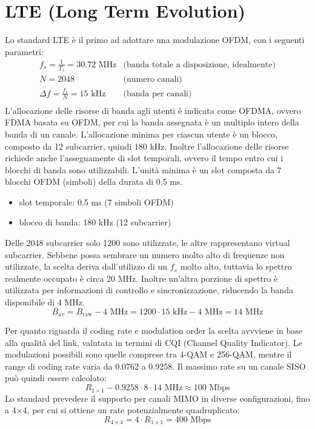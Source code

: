 \section*{LTE (Long Term Evolution)}
Lo standard LTE è il primo ad adottare una modulazione OFDM, con i seguenti parametri:
\[
    \begin{array}{ll}
        f_s = \frac{1}{T_s} = 30.72 \text{ MHz} & \text{(banda totale a disposizione, idealmente)} \\
        N = 2048 & \text{(numero canali)} \\
        \Delta f = \frac{f_s}{N} = 15 \text{ kHz} & \text{(banda per canali)} \\
    \end{array}    
\]
L'allocazione delle risorse di banda agli utenti è indicata come OFDMA, ovvero FDMA basata su OFDM, per cui la banda assegnata è un multiplo intero della banda di un canale. L'allocazione minima per ciascun utente è un blocco, composto da 12 subcarrier, quindi 180 kHz.
Inoltre l'allocazione delle risorse richiede anche l'assegnamente di slot temporali, ovvero il tempo entro cui i blocchi di banda sono utilizzabili. L'unità minima è un slot composta da 7 blocchi OFDM (simboli) della durata di 0.5 ms.
\begin{itemize}
    \item slot temporale: 0.5 ms (7 simboli OFDM) 
    \item blocco di banda: 180 kHz (12 subcarrier)
\end{itemize}
Delle 2048 subcarrier solo 1200 sono utilizzate, le altre rappresentano virtual subcarrier.
Sebbene possa sembrare un numero molto alto di frequenze non utilizzate, la scelta deriva dall'utilizzo di un $f_s$ molto alto, tuttavia lo spettro realmente occupato è circa 20 MHz.
Inoltre un'altra porzione di spettro è utilizzata per informazioni di controllo e sincronizzazione, riducendo la banda disponibile di 4 MHz.
\[
    B_{av} = B_{\text{raw}} - 4 \text{ MHz} = 1200 \cdot 15 \text{ kHz} - 4 \text{ MHz} = 14 \text{ MHz}
\]

Per quanto riguarda il coding rate e modulation order la scelta avvviene in base alla qualità del link, valutata in termini di CQI (Channel Quality Indicator). Le modulazioni possibili sono quelle comprese tra 4-QAM e 256-QAM, mentre il range di coding rate varia da 0.0762 a 0.9258.
Il massimo rate su un canale SISO può quindi essere calcolato:
\[
    R_{1 \times 1} - 0.9258 \cdot 8 \cdot 14 \text{ MHz} \approx 100 \text{ Mbps}
\]
Lo standard prevedere il supporto per canali MIMO in diverse configurazioni, fino a 4$\times$4, per cui si ottiene un rate potenzialmente quadruplicato:
\[
    R_{4 \times 4} = 4 \cdot R_{1 \times 1} = 400 \text{ Mbps}
\]
    
